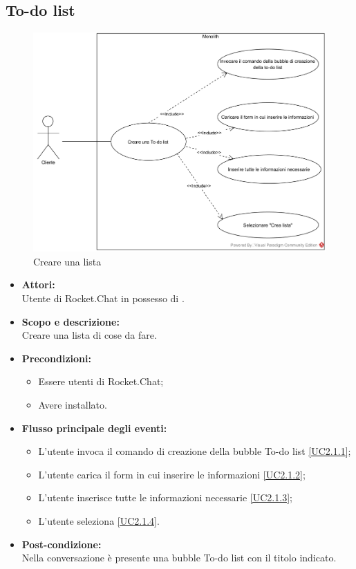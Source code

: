\subsection{To-do list}


\begin{figure}[H]
	\centering
	\includegraphics[width=15cm]{../../documenti/AnalisiDeiRequisiti/Diagrammi_img/uc2_1.png}
	\caption{\UCCaption{} Creare una lista}
\end{figure}

\begin{itemize}
	\item \textbf{Attori:}
	\\Utente di Rocket.Chat in possesso di \ProjectName{}.
	\item \textbf{Scopo e descrizione:} 
	\\Creare una lista di cose da fare.
	\item \textbf{Precondizioni:}
	\begin{itemize}
		\item Essere utenti di Rocket.Chat;
		\item Avere \ProjectName{} installato.
	\end{itemize}
	\item \textbf{Flusso principale degli eventi:}
	\begin{itemize}
		\item L'utente invoca il comando di creazione della bubble To-do list \ref{UC2.1.1};
		\item L'utente carica il form in cui inserire le informazioni \ref{UC2.1.2};
		\item L'utente inserisce tutte le informazioni necessarie \ref{UC2.1.3};
		\item L'utente seleziona  \ref{UC2.1.4}.
	\end{itemize}
	\item \textbf{Post-condizione:}
	\\Nella conversazione è presente una bubble To-do list con il titolo indicato.
\end{itemize}

